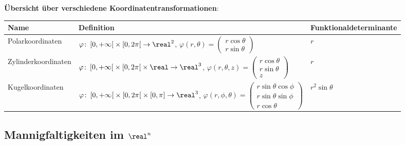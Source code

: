 \linie

\textbf{Übersicht über verschiedene Koordinatentransformationen}:

\begin{tabular}{p{40mm}p{66mm}p{50mm}}
    \toprule
    
    \textbf{Name} & \textbf{Definition} & \textbf{Funktionaldeterminante} \\
    
    \midrule
    
    Polarkoordinaten &
    $\varphi\colon \left[0, +\infty\right[ \times \left[0, 2\pi\right[
    \rightarrow \real^2$, \newline
    $\varphi(r, \theta) = \begin{pmatrix}r \cos \theta \\
    r \sin \theta\end{pmatrix}$ &
    $r$ \\
    
    \midrule
    
    Zylinderkoordinaten &
    $\varphi\colon \left[0, +\infty\right[ \times
    \left[0, 2\pi\right[ \times \real \rightarrow \real^3$, \newline
    $\varphi(r, \theta, z) = \begin{pmatrix}r \cos \theta \\
    r \sin \theta \\ z\end{pmatrix}$ &
    $r$ \\
    
    \midrule
    
    Kugelkoordinaten &
    $\varphi\colon \left[0, +\infty\right[ \times
    \left[0, 2\pi\right[ \times [0, \pi] \rightarrow \real^3$, \newline
    $\varphi(r, \phi, \theta) = \begin{pmatrix}r \sin \theta \cos \phi \\
    r \sin \theta \sin \phi \\ r \cos \theta\end{pmatrix}$ &
    $r^2 \sin \theta$ \\
    
    \bottomrule
\end{tabular}

\pagebreak

\subsection{%
    \texorpdfstring{Mannigfaltigkeiten im $\real^n$}%
    {Mannigfaltigkeiten im ℝⁿ}%
}

